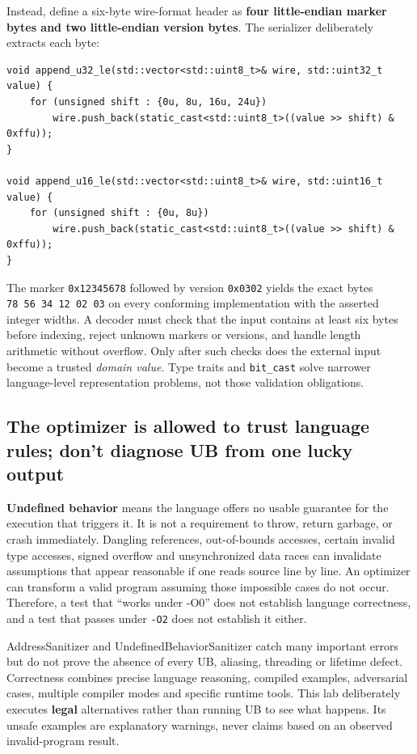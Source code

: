 Instead, define a six-byte wire-format header as \textbf{four little-endian marker bytes and two little-endian version bytes}. The serializer deliberately extracts each byte:

\begin{verbatim}
void append_u32_le(std::vector<std::uint8_t>& wire, std::uint32_t value) {
    for (unsigned shift : {0u, 8u, 16u, 24u})
        wire.push_back(static_cast<std::uint8_t>((value >> shift) & 0xffu));
}

void append_u16_le(std::vector<std::uint8_t>& wire, std::uint16_t value) {
    for (unsigned shift : {0u, 8u})
        wire.push_back(static_cast<std::uint8_t>((value >> shift) & 0xffu));
}
\end{verbatim}

The marker \texttt{0x12345678} followed by version \texttt{0x0302} yields the exact bytes \texttt{78\ 56\ 34\ 12\ 02\ 03} on every conforming implementation with the asserted integer widths. A decoder must check that the input contains at least six bytes before indexing, reject unknown markers or versions, and handle length arithmetic without overflow. Only after such checks does the external input become a trusted \emph{domain value}. Type traits and \texttt{bit\_cast} solve narrower language-level representation problems, not those validation obligations.

\subsection{The optimizer is allowed to trust language rules; don't diagnose UB from one lucky output}\label{01-foundations-i-ch004-the-optimizer-is-allowed-to-trust-language-rules-dont-diagnose-ub-from-one-lucky-output}

\textbf{Undefined behavior} means the language offers no usable guarantee for the execution that triggers it. It is not a requirement to throw, return garbage, or crash immediately. Dangling references, out-of-bounds accesses, certain invalid type accesses, signed overflow and unsynchronized data races can invalidate assumptions that appear reasonable if one reads source line by line. An optimizer can transform a valid program assuming those impossible cases do not occur. Therefore, a test that ``works under -O0'' does not establish language correctness, and a test that passes under \texttt{-O2} does not establish it either.

AddressSanitizer and UndefinedBehaviorSanitizer catch many important errors but do not prove the absence of every UB, aliasing, threading or lifetime defect. Correctness combines precise language reasoning, compiled examples, adversarial cases, multiple compiler modes and specific runtime tools. This lab deliberately executes \textbf{legal} alternatives rather than running UB to see what happens. Its unsafe examples are explanatory warnings, never claims based on an observed invalid-program result.

